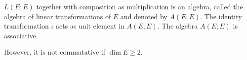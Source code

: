 $L(E; E)$ together with composition as multiplication is an algebra, called the algebra of linear transformations of $E$ and denoted by $A(E; E)$. The identity transformation $\iota$ acts as unit element in $A(E; E)$. The algebra $A(E; E)$ is associative.

However, it is not commutative if $\dim E \geq 2$.
